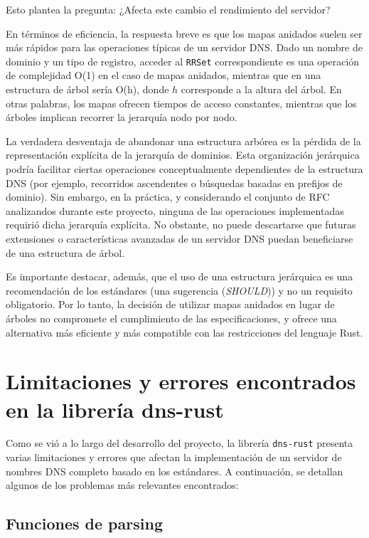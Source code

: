 Esto plantea la pregunta: ¿Afecta este cambio el rendimiento del servidor?

En términos de eficiencia, la respuesta breve es que los mapas anidados suelen ser más rápidos para las operaciones típicas de un servidor DNS. Dado un nombre de dominio y un tipo de registro, 
acceder al \texttt{RRSet} correspondiente es una operación de complejidad O(1) en el caso de mapas anidados, mientras que en una estructura de árbol sería O(h), donde 
$h$ corresponde a la altura del árbol. En otras palabras, los mapas ofrecen tiempos de acceso constantes, mientras que los árboles implican recorrer la jerarquía nodo por nodo.

La verdadera desventaja de abandonar una estructura arbórea es la pérdida de la representación explícita de la jerarquía de dominios. Esta organización jerárquica podría facilitar ciertas operaciones
 conceptualmente dependientes de la estructura DNS (por ejemplo, recorridos ascendentes o búsquedas basadas en prefijos de dominio). Sin embargo, en la práctica, y considerando el conjunto de RFC 
 analizandos durante este proyecto, ninguna de las operaciones implementadas requirió dicha jerarquía explícita. No obstante, no puede descartarse que futuras extensiones o características avanzadas 
 de un servidor DNS puedan beneficiarse de una estructura de árbol.

Es importante destacar, además, que el uso de una estructura jerárquica es una recomendación de los estándares (una sugerencia (\textit{SHOULD})) y no un requisito obligatorio. Por lo tanto, 
la decisión de utilizar mapas anidados en lugar de árboles no compromete el cumplimiento de las especificaciones, y ofrece una alternativa más eficiente y más compatible con las restricciones 
del lenguaje Rust.

\section{Limitaciones y errores encontrados en la librería dns-rust}

Como se vió a lo largo del desarrollo del proyecto, la librería \texttt{dns-rust} presenta varias limitaciones y errores que afectan la implementación de un servidor de nombres DNS completo 
basado en los estándares. A continuación, se detallan algunos de los problemas más relevantes encontrados:

\subsection{Funciones de parsing}\label{sec:funciones-parsing}

